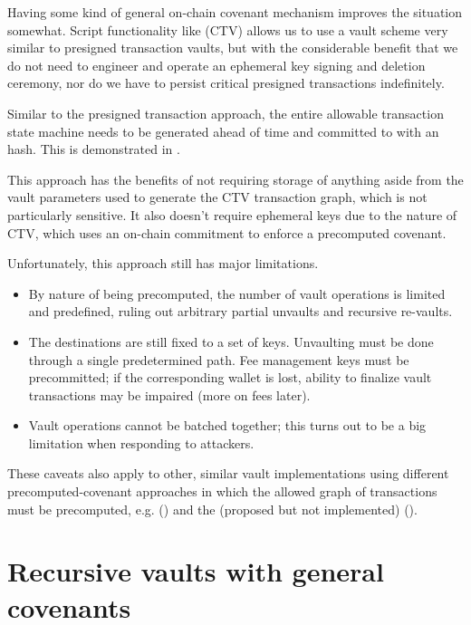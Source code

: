 \documentclass[10pt]{article}
\begin{document}
Having some kind of general on-chain covenant mechanism improves the situation
somewhat. Script functionality like \ctv{} (CTV) \cite{CTV} allows us to use a vault
scheme very similar to presigned transaction vaults, but with the considerable benefit
that we do not need to engineer and operate an ephemeral key signing and deletion
ceremony, nor do we have to persist critical presigned transactions indefinitely.

Similar to the presigned transaction approach, the entire allowable transaction
state machine needs to be generated ahead of time and committed to with an \ctv{} hash. 
This is demonstrated in \cite{OBeirne}.

This approach has the benefits of not requiring storage of anything aside from the vault
parameters used to generate the CTV transaction graph, which is not particularly
sensitive. It also doesn't require ephemeral keys due to the nature of CTV, which uses
an on-chain commitment to enforce a precomputed covenant.

Unfortunately, this approach still has major limitations. 

\begin{itemize}

  \item By nature of being precomputed, the number of
    vault operations is limited and predefined, ruling out arbitrary partial
    unvaults and recursive re-vaults. 

  \item The destinations are still fixed to a set of keys. Unvaulting
    must be done through a single predetermined path. Fee management keys must be
    precommitted; if the corresponding wallet is lost, ability to finalize vault 
    transactions may be impaired (more on fees later). 

  \item Vault operations cannot be batched together; this turns out to be a big
    limitation when responding to attackers.

\end{itemize}

These caveats also apply to other, similar vault implementations using different
precomputed-covenant approaches in which the allowed graph of transactions must be
precomputed, e.g.  (\cite{APOVaults}) and the (proposed but not implemented)
 (\cite{OPTX}).

\section*{Recursive vaults with general covenants}
\end{document}
